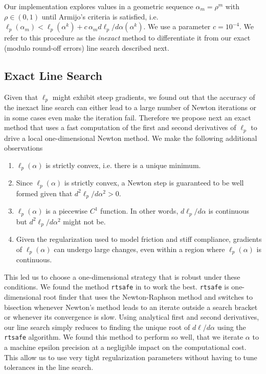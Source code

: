 Our implementation explores values in a geometric sequence $\alpha_{m} = \rho^m$
with $\rho \in (0, 1)$ until Armijo's criteria is satisfied, i.e.
$\ell_p(\alpha_m) < \ell_p(\alpha^k) + c\,\alpha_m d\ell_p/d\alpha(\alpha^k)$.
We use a parameter $c=10^{-4}$. We refer to this procedure as the
\textit{inexact} method to differentiate it from our exact (modulo round-off
errors) line search described next.

\subsection{Exact Line Search}
Given that $\ell_p$ might exhibit steep gradients, we found out that the
accuracy of the inexact line search can either lead to a large number of Newton
iterations or in some cases even make the iteration fail.
Therefore we propose next an exact method that uses a fast computation of the
first and second derivatives of $\ell_p$ to drive a local one-dimensional Newton
method. We make the following additional observations
\begin{enumerate}
	\item $\ell_p(\alpha)$ is strictly convex, i.e. there is a unique minimum.
	\item Since $\ell_p(\alpha)$ is strictly convex, a Newton step is guaranteed
	to be well formed given that $d^2\ell_p/d\alpha^2>0$.
	\item $\ell_p(\alpha)$ is a piecewise $C^1$ function. In other words,
	$d\ell_p/d\alpha$ is continuous but $d^2\ell_p/d\alpha^2$ might not be.	
	\item Given the regularization used to model friction and stiff compliance,
	gradients of $\ell_p(\alpha)$ can undergo large changes, even within a
	region where $\ell_p(\alpha)$ is continuous.
\end{enumerate}

This led us to choose a one-dimensional strategy that is robust under these
conditions. We found the method \verb;rtsafe; in \cite[\S
9.4]{bib:numerical_recipes} to work the best. \verb;rtsafe; is one-dimensional
root finder that uses the Newton-Raphson method and switches to bisection
whenever Newton's method leads to an iterate outside a search bracket or
whenever its convergence is slow. Using analytical first and second derivatives,
our line search simply reduces to finding the unique root of $d\ell/d\alpha$
using the \verb;rtsafe; algorithm. We found this method to perform so well, that
we iterate $\alpha$ to a machine epsilon precision at a negligible impact on the
computational cost. This allow us to use very tight regularization parameters
without having to tune tolerances in the line search.


